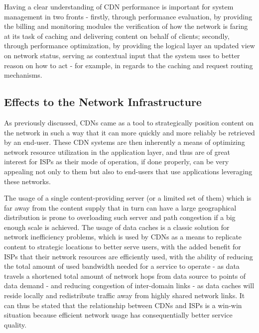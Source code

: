     Having a clear understanding of CDN performance is important for system management in two fronts - firstly, through performance evaluation, by providing the billing and monitoring modules the verification of how the network is faring at its task of caching and delivering content on behalf of clients; secondly, through performance optimization, by providing the logical layer an updated view on network status, serving as contextual input that the system uses to better reason on how to act - for example, in regards to the caching and request routing mechanisms.

\subsection{Effects to the Network Infrastructure}

    As previously discussed, CDNs came as a tool to strategically position content on the network in such a way that it can more quickly and more reliably be retrieved by an end-user.
    These CDN systems are then inherently a means of optimizing network resource utilization in the application layer, and thus are of great interest for ISPs as their mode of operation, if done properly, can be very appealing not only to them but also to end-users that use applications leveraging these networks.

    The usage of a single content-providing server (or a limited set of them) which is far away from the content supply that in turn can have a large geographical distribution is prone to overloading such server and path congestion if a big enough scale is achieved.
    The usage of data caches is a classic solution for network inefficiency problems, which is used by CDNs as a means to replicate content to strategic locations to better serve users, with the added benefit for ISPs that their network resources are efficiently used, with the ability of reducing the total amount of used bandwidth needed for a service to operate - as data travels a shortened total amount of network hops from data source to points of data demand - and reducing congestion of inter-domain links - as data caches will reside locally and redistribute traffic away from highly shared network links.
    It can thus be stated that the relationship between CDNs and ISPs is a win-win situation because efficient network usage has consequentially better service quality.

